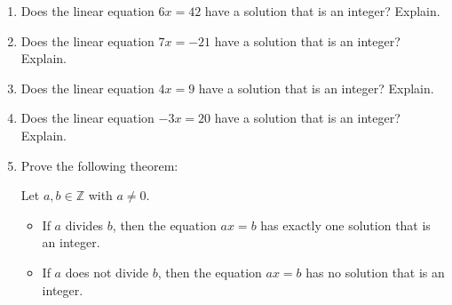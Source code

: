 \begin{previewactivity} \label{PA:integersolutions} \hfill
\begin{enumerate}
\item Does the linear equation $6x = 42$ have a solution that is an integer?  Explain.

\item Does the linear equation $7x = -21$ have a solution that is an integer?  Explain.

\item Does the linear equation $4x = 9$ have a solution that is an integer?  Explain.
\item Does the linear equation $-3x = 20$ have a solution that is an integer?  Explain.


\item Prove the following theorem:

\begin{theorem}\label{prop:lindiophone}%
Let $a, b \in \mathbb{Z}$ with $a \ne 0$. 

\begin{itemize}
\item If $a$ divides $b$, then the equation $ax = b$ has exactly one solution that is an integer.
\item If $a$ does not divide $b$, then the equation $ax = b$ has no solution that is an integer.  
\end{itemize}
\end{theorem}

\end{enumerate}
\end{previewactivity}
\hbreak

\endinput
